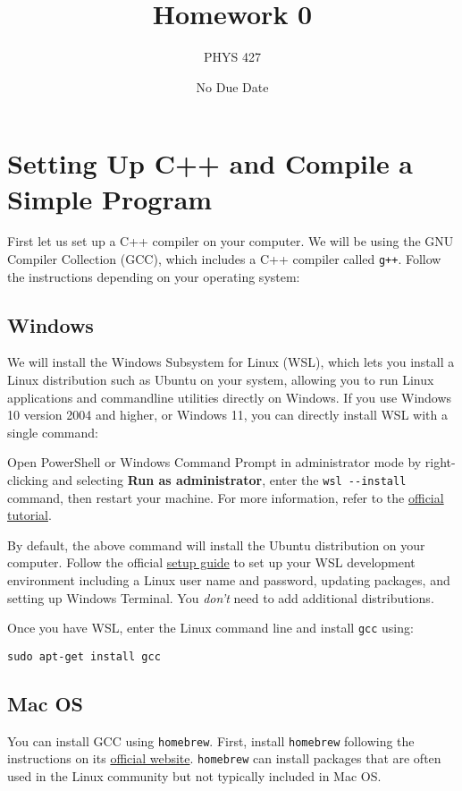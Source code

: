 \documentclass[12pt]{article}
\title{Homework 0}
\author{PHYS 427}
\date{No Due Date}
\begin{document}
\maketitle

\section{Setting Up C++ and Compile a Simple Program}

First let us set up a C++ compiler on your computer. We will be using the GNU
Compiler Collection (GCC), which includes a C++ compiler called \verb|g++|.
Follow the instructions depending on your operating system:

\subsection{Windows}

We will install the Windows Subsystem for Linux (WSL), which lets you install a Linux distribution such as Ubuntu on your system, allowing you to run Linux applications and commandline utilities directly on Windows. If you use Windows 10 version 2004 and higher, or Windows 11, you can directly install WSL with a single command:

Open PowerShell or Windows Command Prompt in administrator mode by
right-clicking and selecting \textbf{Run as administrator}, enter the
\verb|wsl --install| command, then restart your machine. For more information,
refer to the
\href{https://learn.microsoft.com/en-us/windows/wsl/install}{official tutorial}.

By default, the above command will install the Ubuntu distribution on your computer. Follow the official \href{https://learn.microsoft.com/en-us/windows/wsl/setup/environment}{setup guide} to set up your WSL development environment including a Linux user name and password, updating packages, and setting up Windows Terminal. You \emph{don't} need to add additional distributions.

Once you have WSL, enter the Linux command line and install \verb+gcc+ using:
\begin{verbatim}
sudo apt-get install gcc
\end{verbatim}

\subsection{Mac OS}

You can install GCC using \verb+homebrew+. First, install \verb+homebrew+
following the instructions on its \href{https://brew.sh/}{official website}.
\verb+homebrew+ can install packages that are often used in the Linux community
but not typically included in Mac OS.
\end{document}
